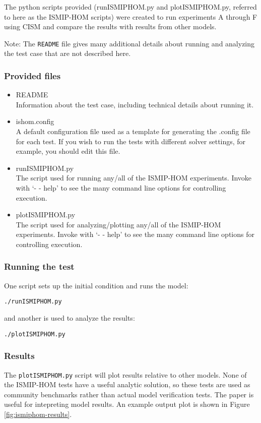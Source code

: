 The python scripts provided (runISMIPHOM.py and plotISMIPHOM.py, referred to here as the ISMIP-HOM 
scripts) were created to run experiments A through F using CISM and compare the results with results from other models. 

Note: The \texttt{README} file gives many additional details about running and analyzing the
test case that are not described here.

\subsubsection{Provided files}

\begin{itemize}
	\item README \\
		Information about the test case, including technical details about running it.
	\item ishom.config \\
		A default configuration file used as a template for generating the .config file for each test.
    		If you wish to run the tests with different solver settings, for example, you should edit this file.
	\item runISMIPHOM.py \\
		The script used for running any/all of the ISMIP-HOM experiments.  
    		Invoke with `- - help' to see the many command line options for controlling execution.
  \item plotISMIPHOM.py \\
		The script used for analyzing/plotting any/all of the ISMIP-HOM experiments.  
    		Invoke with `- - help' to see the many command line options for controlling execution.
\end{itemize}

\subsubsection{Running the test}
One script sets up the initial condition and runs the model:

\texttt{./runISMIPHOM.py}

\noindent
and another is used to analyze the results:

\texttt{./plotISMIPHOM.py}

\subsubsection{Results}
The \texttt{plotISMIPHOM.py} script will plot results relative to other models.
None of the ISMIP-HOM tests have a useful analytic solution, so these tests are
used as community benchmarks rather than actual model verification tests.
The \citet{Pattyn2008} paper is useful for intepreting model results.
An example output plot is shown in Figure \ref{fig:ismiphom-results}.


